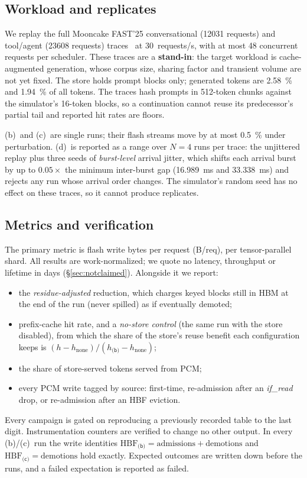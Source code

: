 \documentclass[conference]{IEEEtran}
\newcommand{\cfgb}{\textsf{(b)}}
\newcommand{\cfgc}{\textsf{(c)}}
\newcommand{\cfgd}{\textsf{(d)}}
\begin{document}
\subsection{Workload and replicates}
We replay the full Mooncake FAST'25 conversational (\num{12031} requests) and
tool/agent (\num{23608} requests) traces~\cite{mooncake} at
30~requests/s, with at most 48 concurrent requests per
scheduler. These traces are a \textbf{stand-in}: the target workload is
cache-augmented generation, whose corpus size, sharing factor and transient
volume are not yet fixed. The store holds prompt blocks only; generated tokens
are \SI{2.58}{\percent} and \SI{1.94}{\percent} of all tokens. The traces hash
prompts in 512-token chunks against the simulator's 16-token blocks, so a
continuation cannot reuse its predecessor's partial tail and reported hit rates
are floors.

\cfgb\ and \cfgc\ are single runs; their flash streams move by at most
\SI{0.5}{\percent} under perturbation. \cfgd\ is reported as a range over
$N=4$ runs per trace: the unjittered replay plus three seeds of
\emph{burst-level} arrival jitter, which shifts each arrival burst by up to
$0.05\times$ the minimum inter-burst gap (\SI{16.989}{\milli\second} and
\SI{33.338}{\milli\second}) and rejects any run whose arrival order changes. The
simulator's random seed has no effect on these traces, so it cannot produce
replicates.

\subsection{Metrics and verification}
The primary metric is flash write bytes per request (B/req), per
tensor-parallel shard. All results are work-normalized; we quote no latency,
throughput or lifetime in days (\S\ref{sec:notclaimed}). Alongside it we report:
\begin{itemize}
  \item the \emph{residue-adjusted} reduction, which charges keyed blocks still
        in HBM at the end of the run (never spilled) as if eventually demoted;
  \item prefix-cache hit rate, and a \emph{no-store control} (the same run with
        the store disabled), from which the share of the store's reuse benefit
        each configuration keeps is
        $(h - h_\text{none}) / (h_{\cfgb} - h_\text{none})$;
  \item the share of store-served tokens served from PCM;
  \item every PCM write tagged by source: first-time, re-admission after an
        \emph{if\_read} drop, or re-admission after an HBF eviction.
\end{itemize}
Every campaign is gated on reproducing a previously recorded table to the last
digit. Instrumentation counters are verified to change no other output. In
every \cfgb/\cfgc\ run the write identities
$\text{HBF}_{\cfgb} = \text{admissions} + \text{demotions}$ and
$\text{HBF}_{\cfgc} = \text{demotions}$ hold exactly. Expected outcomes are
written down before the runs, and a failed expectation is reported as failed.
\end{document}
